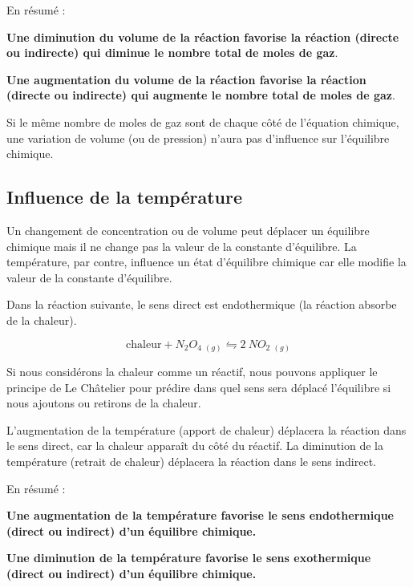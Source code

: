 \documentclass[
  11pt,
  french,
  a4paper,
  openany]{book}
\begin{document}
En résumé :

\textbf{Une diminution du volume de la réaction favorise la réaction (directe ou indirecte) qui diminue le nombre total de moles de gaz}.

\textbf{Une augmentation du volume de la réaction favorise la réaction (directe ou indirecte) qui augmente le nombre total de moles de gaz}.

Si le même nombre de moles de gaz sont de chaque côté de l'équation chimique, une variation de volume (ou de pression) n'aura pas d'influence sur l'équilibre chimique.

\hypertarget{influence-de-la-tempuxe9rature}{%
\subsection{Influence de la température}\label{influence-de-la-tempuxe9rature}}

Un changement de concentration ou de volume peut déplacer un équilibre chimique mais il ne change pas la valeur de la constante d'équilibre. La température, par contre, influence un état d'équilibre chimique car elle modifie la valeur de la constante d'équilibre.

Dans la réaction suivante, le sens direct est endothermique (la réaction absorbe de la chaleur).

\[
  \text{chaleur} + N_2O_4\ {}_{(g)} \leftrightharpoons 2\ NO_2\ {}_{(g)}
\]

Si nous considérons la chaleur comme un réactif, nous pouvons appliquer le principe de Le Châtelier pour prédire dans quel sens sera déplacé l'équilibre si nous ajoutons ou retirons de la chaleur.

L'augmentation de la température (apport de chaleur) déplacera la réaction dans le sens direct, car la chaleur apparaît du côté du réactif. La diminution de la température (retrait de chaleur) déplacera la réaction dans le sens indirect.

\clearpage

En résumé :

\textbf{Une augmentation de la température favorise le sens endothermique (direct ou indirect) d'un équilibre chimique.}

\textbf{Une diminution de la température favorise le sens exothermique (direct ou indirect) d'un équilibre chimique.}
\end{document}
